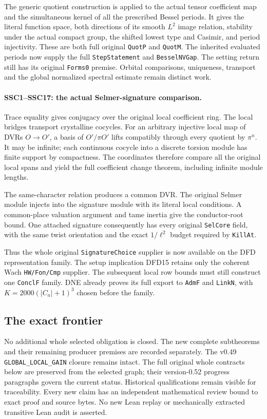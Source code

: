The generic quotient construction is applied to the actual tensor
coefficient map and the simultaneous kernel of all the prescribed
Bessel periods. It gives the literal function space, both directions
of its smooth $L^2$ image relation, stability under the actual compact
group, the shifted lowest type and Casimir, and period injectivity.
These are both full original \texttt{QuotP} and \texttt{QuotM}.
The inherited evaluated periods now supply the full
\texttt{StepStatement} and \texttt{BesselNVGap}.
The setting return still has its original \texttt{Forms0}
premise. Orbital comparisons, uniqueness, transport and the global
normalized spectral estimate remain distinct work.

\paragraph{SSC1--SSC17: the actual Selmer-signature comparison.}
Trace equality gives conjugacy over the original local coefficient
ring. The local bridges transport crystalline cocycles. For an
arbitrary injective local map of DVRs $O\to O'$, a basis of
$O'/\pi O'$ lifts compatibly through every quotient by $\pi^n$.
It may be infinite; each continuous cocycle into a discrete torsion
module has finite support by compactness. The coordinates therefore
compare all the original local spans and yield the full coefficient
change theorem, including infinite module lengths.

The same-character relation produces a common DVR. The original
Selmer module injects into the signature module with its literal
local conditions. A common-place valuation argument and tame inertia
give the conductor-root bound. One attached signature consequently
has every original \texttt{SelCore} field, with the same twist
orientation and the exact $1/\ell^2$ budget required by
\texttt{KillAt}.

Thus the whole original \texttt{SignatureChoice} supplier is now
available on the DFD representation family. The setup implication
DFD15 retains only the coherent Wach \texttt{HW/Fon/Cmp} supplier.
The subsequent local row bounds must still construct one
\texttt{ConclF} family. DNE already proves its full export to
\texttt{AdmF} and \texttt{LinkN}, with
$K=2000(|C_a|+1)^3$ chosen before the family.

\subsection{The exact frontier}

No additional whole selected obligation is closed. The new complete
subtheorems and their remaining producer premises are recorded
separately. The v0.49 \texttt{GLOBAL\_LOCAL\_GAIN} closure
remains intact. The full original whole contracts below are preserved
from the selected graph; their version-0.52 progress paragraphs
govern the current status. Historical qualifications remain visible
for traceability. Every new claim has an independent mathematical
review bound to exact proof and source bytes. No new Lean replay
or mechanically extracted transitive Lean audit is asserted.
